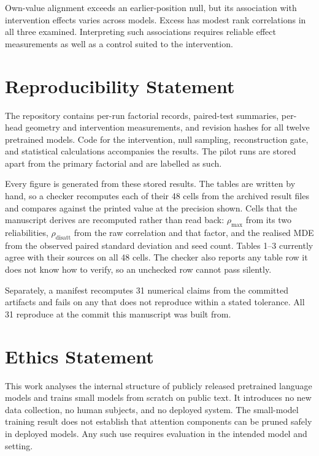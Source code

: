 \documentclass{article} %
\begin{document}
Own-value alignment exceeds an earlier-position null, but its association
with intervention effects varies across models. Excess has modest rank
correlations in all three examined. Interpreting such associations requires
reliable effect measurements as well as a control suited to the intervention.

\section*{Reproducibility Statement}

The repository contains per-run factorial records, paired-test summaries,
per-head geometry and intervention measurements, and revision hashes for all
twelve pretrained models. Code for the intervention, null sampling,
reconstruction gate, and statistical calculations accompanies the results.
The pilot runs are stored apart from the primary factorial and are labelled
as such.

Every figure is generated from these stored results. The tables are written by
hand, so a checker recomputes each of their 48 cells from the archived result
files and compares against the printed value at the precision shown. Cells
that the manuscript derives are recomputed rather than read back:
$\rho_{\max}$ from its two reliabilities, $\rho_{\text{disatt}}$ from the raw
correlation and that factor, and the realised MDE from the observed paired
standard deviation and seed count. Tables 1--3 currently agree with their
sources on all 48 cells. The checker also reports any table row it does not
know how to verify, so an unchecked row cannot pass silently.

Separately, a manifest recomputes 31 numerical claims from the committed
artifacts and fails on any that does not reproduce within a stated tolerance.
All 31 reproduce at the commit this manuscript was built from.

\section*{Ethics Statement}

This work analyses the internal structure of publicly released pretrained
language models and trains small models from scratch on public text. It
introduces no new data collection, no human subjects, and no deployed system.
The small-model training result does not establish that attention components
can be pruned safely in deployed models. Any such use requires evaluation in
the intended model and setting.
\end{document}
